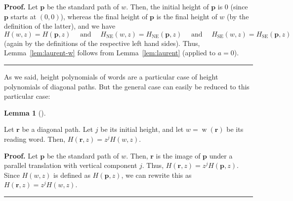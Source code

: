\documentclass[numbers=enddot,12pt,final,onecolumn,notitlepage]{scrartcl}%
\theoremstyle{definition}
\newtheorem{lem}[theo]{Lemma}
\newenvironment{lemma}[1][]
{\begin{lem}[#1]\begin{leftbar}}
{\end{leftbar}\end{lem}}
\newenvironment{proof}[1][Proof]{\noindent\textbf{#1.} }{\ \rule{0.5em}{0.5em}}
\newcommand{\pp}{\mathbf{p}}
\newcommand{\rr}{\mathbf{r}}
\newcommand{\SE}{\operatorname{SE}}
\newcommand{\NE}{\operatorname{NE}}
\newcommand{\w}{\operatorname{w}}
\newcommand{\tup}[1]{\left( #1 \right)}
\newenvironment{vershort}{}{}
\begin{document}
\begin{proof}
Let $\pp$ be the standard path of $w$.
Then, the initial height of $\pp$ is $0$ (since $\pp$ starts at $\tup{0,0}$), whereas the final height of $\pp$ is the final height of $w$ (by the definition of the latter), and we have
\[
H(w,z) = H(\pp,z)
\quad \text{ and } \quad
H_{\NE}(w,z) = H_{\NE}(\pp,z)
\quad \text{ and } \quad
H_{\SE}(w,z) = H_{\SE}(\pp,z)
\]
(again by the definitions of the respective left hand sides).
Thus, Lemma~\ref{lem:laurent-w} follows from Lemma~\ref{lem:laurent} (applied to $a = 0$).
\end{proof}

As we said, height polynomials of words are a particular case of height polynomials of diagonal paths.
But the general case can easily be reduced to this particular case:

\begin{lemma}
\label{lem.H.shift}
Let $\rr$ be a diagonal path. Let $j$ be its initial
height, and let $w=\w\left(  \rr\right)  $ be its
reading word. Then, $H\left(  \rr,z\right)  =z^{j}H\left(  w,z\right)
$.
\end{lemma}

\begin{vershort}
\begin{proof}
Let $\pp$ be the standard path of $w$.
Then, $\rr$ is the image of $\pp$ under a parallel translation with vertical component $j$.
Thus, $H\tup{\rr, z} = z^j H\tup{\pp, z}$.
Since $H\tup{w, z}$ is defined as $H\tup{\pp, z}$, we can rewrite this as $H\tup{\rr, z} = z^j H\tup{w, z}$.
\end{proof}
\end{vershort}
\end{document}
